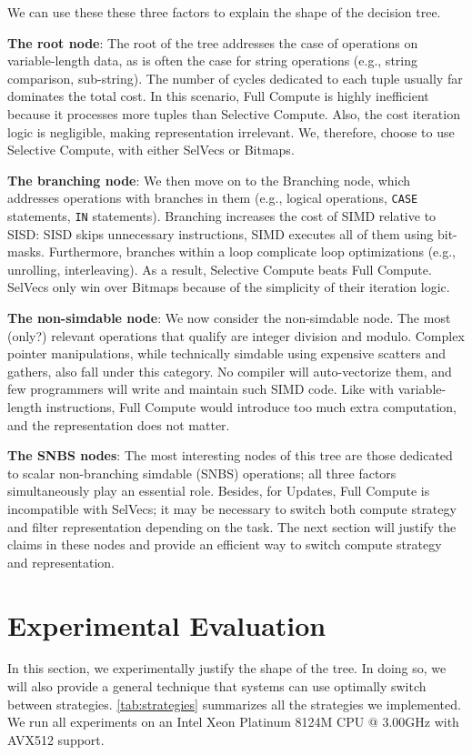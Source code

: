 \documentclass[12pt]{cmuthesis}
\begin{document}
We can use these these three factors to explain the shape of the decision tree.


\textbf{The root node}: The root of the tree addresses the case of operations on variable-length data, as is often the case for string operations (e.g., string comparison, sub-string). The number of cycles dedicated to each tuple usually far dominates the total cost. In this scenario, Full Compute is highly inefficient because it processes more tuples than Selective Compute. Also, the cost iteration logic is negligible, making representation irrelevant. We, therefore, choose to use Selective Compute, with either SelVecs or Bitmaps.


\textbf{The branching node}: We then move on to the Branching node, which addresses operations with branches in them (e.g., logical operations, \texttt{CASE} statements, \texttt{IN} statements). Branching increases the cost of SIMD relative to SISD: SISD skips unnecessary instructions, SIMD executes all of them using bit-masks. Furthermore, branches within a loop complicate loop optimizations (e.g., unrolling, interleaving). As a result, Selective Compute beats Full Compute. SelVecs only win over Bitmaps because of the simplicity of their iteration logic.

\textbf{The non-simdable node}: We now consider the non-simdable node. The most (only?) relevant operations that qualify are integer division and modulo. Complex pointer manipulations, while technically simdable using expensive scatters and gathers, also fall under this category. No compiler will auto-vectorize them, and few programmers will write and maintain such SIMD code. Like with variable-length instructions, Full Compute would introduce too much extra computation, and the representation does not matter.

\textbf{The SNBS nodes}: The most interesting nodes of this tree are those dedicated to scalar non-branching simdable (SNBS) operations; all three factors simultaneously play an essential role. Besides, for Updates, Full Compute is incompatible with SelVecs; it may be necessary to switch both compute strategy and filter representation depending on the task. The next section will justify the claims in these nodes and provide an efficient way to switch compute strategy and representation.



\chapter{Experimental Evaluation}
In this section, we experimentally justify the shape of the tree. In doing so, we will also provide a general technique that systems can use optimally switch between strategies. \cref{tab:strategies} summarizes all the strategies we implemented. We run all experiments on an Intel Xeon Platinum 8124M CPU @ 3.00GHz with AVX512 support.
\end{document}
